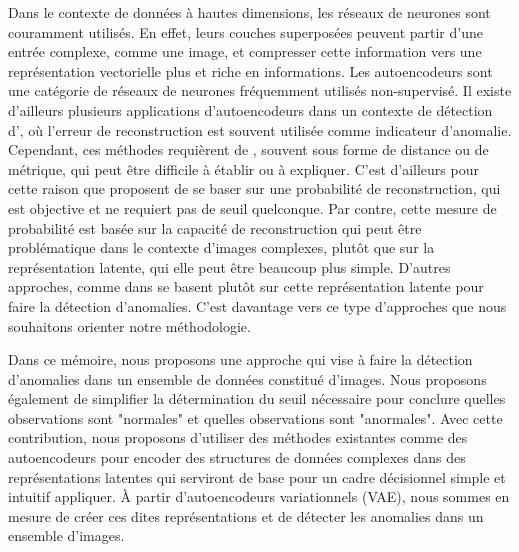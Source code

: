 Dans le contexte de données à hautes dimensions, les réseaux de neurones sont couramment utilisés. En effet, leurs couches superposées peuvent partir d'une entrée complexe, comme une image, et compresser cette information vers une représentation vectorielle plus \DIFdelbegin {}\DIFdelend \DIFaddbegin {}\DIFaddend et riche en informations. Les autoencodeurs sont une catégorie de réseaux de neurones fréquemment utilisés \DIFdelbegin {}\DIFdelend \DIFaddbegin {}\DIFaddend non-supervisé. Il existe d'ailleurs plusieurs applications d'autoencodeurs dans un contexte de détection d'\DIFdelbegin {}\DIFdelend \DIFaddbegin {}\DIFaddend , où l'erreur de reconstruction est souvent utilisée comme indicateur d'anomalie. Cependant, ces méthodes requièrent de \DIFdelbegin {}\DIFdelend \DIFaddbegin {}\DIFaddend , souvent sous forme de distance ou de métrique, qui peut être difficile à établir ou à expliquer. C'est d'ailleurs pour cette raison que  \cite{An2015VariationalAB} proposent de se baser sur une probabilité de reconstruction, qui est \DIFdelbegin {}\DIFdelend \DIFaddbegin {}\DIFaddend objective et ne requiert pas de seuil quelconque. Par contre, cette mesure de probabilité est basée sur la capacité de reconstruction \DIFdelbegin \DIFdel{, }\DIFdelend \DIFaddbegin {}\DIFaddend qui peut être problématique dans le contexte d'images complexes, plutôt que sur la représentation latente, qui elle peut être beaucoup plus simple. D'autres approches, comme dans \cite{DBLP:journals/corr/abs-1802-06360} se basent plutôt sur cette représentation latente pour faire la détection d'anomalies. C'est davantage vers ce type d'approches que nous souhaitons orienter notre méthodologie. 

Dans ce mémoire, nous proposons une approche qui vise à faire la détection d'anomalies dans un ensemble de données constitué d'images. Nous proposons également de simplifier la détermination du seuil nécessaire pour conclure quelles observations sont "normales" et quelles observations sont "anormales". Avec cette contribution, nous proposons d'utiliser des méthodes existantes comme des autoencodeurs  pour encoder des structures de données complexes dans des représentations latentes qui serviront de base pour un cadre décisionnel simple et intuitif \DIFaddbegin {}\DIFaddend appliquer. À partir d'autoencodeurs variationnels (VAE), nous sommes en mesure de créer ces dites représentations et de détecter les anomalies dans un ensemble \DIFdelbegin {}\DIFdelend d'images.